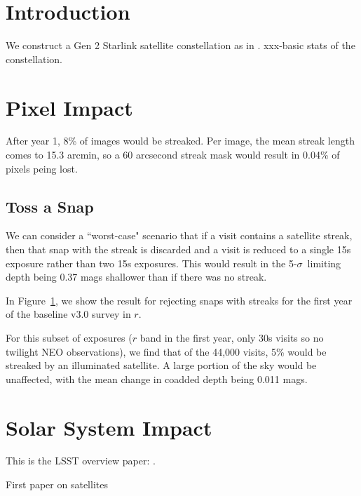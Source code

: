 \section{Introduction}

We construct a Gen 2 Starlink satellite constellation as in \citet{Hu2022}. xxx-basic stats of the constellation.



\section{Pixel Impact}

After year 1, 8\% of images would be streaked. Per image, the mean streak length comes to 15.3 arcmin, so a 60 arcsecond streak mask would result in 0.04\% of pixels peing lost.





\subsection{Toss a Snap}

We can consider a ``worst-case" scenario that if a visit contains a satellite streak, then that snap with the streak is discarded and a visit is reduced to a single 15s exposure rather than two 15s exposures. This would result in the 5-$\sigma$\ limiting depth being 0.37 mags shallower than if there was no streak.

In Figure~\ref{fig:depth_change}, we show the result for rejecting snaps with streaks for the first year of the baseline v3.0 survey in $r$. 

For this subset of exposures ($r$ band in the first year, only 30s visits so no twilight NEO observations), we find that of the 44,000 visits, 5\% would be streaked by an illuminated satellite. A large portion of the sky would be unaffected, with the mean change in coadded depth being 0.011 mags. 

\begin{figure}
\caption{ \label{fig:depth_change}}
\end{figure}



\section{Solar System Impact}


This is the LSST overview paper: \cite{2008arXiv0805.2366I}.

First paper on satellites \citet{Hu2022}
